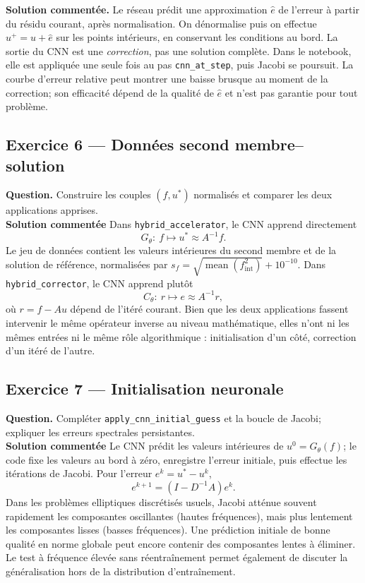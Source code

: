 \documentclass[11pt,a4paper]{article}
\begin{document}
\textbf{Solution commentée.} Le réseau prédit une approximation
$\widehat e$ de l'erreur à partir du résidu courant, après
normalisation. On dénormalise puis on effectue
$u^+=u+\widehat e$ sur les points intérieurs, en conservant les
conditions au bord. La sortie du CNN est une \emph{correction},
pas une solution complète. Dans le notebook, elle est appliquée
une seule fois au pas \texttt{cnn\_at\_step}, puis Jacobi se poursuit.
La courbe d'erreur relative peut montrer une baisse brusque au
moment de la correction; son efficacité dépend de la qualité de
$\widehat e$ et n'est pas garantie pour tout problème.

\subsection{Exercice 6 --- Données second membre--solution}

\textbf{Question.} Construire les couples $(f,u^*)$ normalisés et
comparer les deux applications apprises.
\\

\textbf{Solution commentée} Dans \texttt{hybrid\_accelerator},
le CNN apprend directement
\[
G_\theta:\ f\longmapsto u^*\approx A^{-1}f.
\]
Le jeu de données contient les valeurs intérieures du second
membre et de la solution de référence, normalisées par
$s_f=\sqrt{\operatorname{mean}(f_{\mathrm{int}}^2)}+10^{-10}$.
Dans \texttt{hybrid\_corrector}, le CNN apprend plutôt
\[
C_\theta:\ r\longmapsto e\approx A^{-1}r,
\]
où $r=f-Au$ dépend de l'itéré courant. Bien que les deux
applications fassent intervenir le même opérateur inverse au
niveau mathématique, elles n'ont ni les mêmes entrées ni le même
rôle algorithmique : initialisation d'un côté, correction d'un
itéré de l'autre.

\subsection{Exercice 7 --- Initialisation neuronale}

\textbf{Question.} Compléter \texttt{apply\_cnn\_initial\_guess}
et la boucle de Jacobi; expliquer les erreurs spectrales persistantes.
\\

\textbf{Solution commentée} Le CNN prédit les valeurs
intérieures de $u^0=G_\theta(f)$; le code fixe les valeurs au
bord à zéro, enregistre l'erreur initiale, puis effectue les
itérations de Jacobi. Pour l'erreur $e^k=u^*-u^k$,
\[
e^{k+1}=(I-D^{-1}A)e^k.
\]
Dans les problèmes elliptiques discrétisés usuels, Jacobi
atténue souvent rapidement les composantes oscillantes
(hautes fréquences), mais plus lentement les composantes
lisses (basses fréquences). Une prédiction initiale de bonne
qualité en norme globale peut encore contenir des composantes
lentes à éliminer. Le test à fréquence élevée sans
réentraînement permet également de discuter la généralisation
hors de la distribution d'entraînement.
\end{document}
